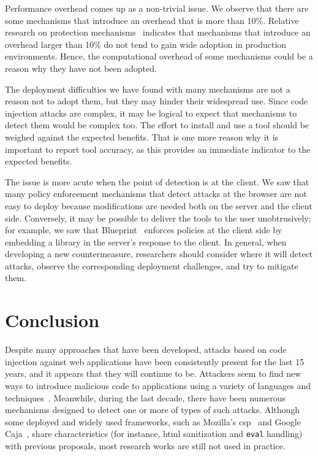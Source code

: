 \documentclass[conference]{IEEEtran}
\begin{document}
Performance overhead comes up as a non-trivial issue. We observe
that there are some mechanisms that introduce an overhead
that is more than 10\%. Relative
research on protection mechanisms~\cite{SPWS13} indicates that
mechanisms that introduce an overhead larger than 10\% do not tend to
gain wide adoption in production environments. Hence, the
computational overhead of some mechanisms could be a reason why they
have not been adopted.

The deployment difficulties we have found with many mechanisms are not
a reason not to adopt them, but they may hinder their widespread use.
Since code injection attacks are complex, it may be logical to
expect that mechanisms to detect them would be complex too. The effort
to install and use a tool should be weighed against the expected
benefits. That is one more reason why it is important to report tool
accuracy, as this provides an immediate indicator to the expected
benefits. 

The issue is more acute when the point of detection is at the client.
We saw that many policy enforcement mechanisms that detect attacks at
the browser are not easy to deploy because modifications are needed
both on the server and the client side.
Conversely, it may be possible to deliver
the tools to the user unobtrusively; for example, we saw that
Blueprint~\cite{LV09} enforces policies at the client side by embedding a library
in the server's response to the client. In general, when developing a
new countermeasure, researchers should consider where it
will detect attacks, observe the corresponding deployment
challenges, and try to mitigate them.

\section{Conclusion}
\label{sec:conclusion}

Despite many approaches that have been developed,
attacks based on code injection against web applications
have been consistently present for the last 15 years,
and it appears that they will continue to be.
Attackers seem to find new ways to introduce
malicious code to applications using a
variety of languages and techniques~\cite{HNSHS12,DKH14}.
Meanwhile, during the last decade, there have been
numerous mechanisms designed to
detect one or more of types of such attacks.
Although some deployed and widely used frameworks, 
such as Mozilla's {\sc csp}~\cite{SSM10} and
Google Caja~\cite{M06,caja}, share characteristics
(for instance, {\sc html} sanitization and {\tt eval} handling)
with previous proposals, 
most research works are still not used in practice.
\end{document}
